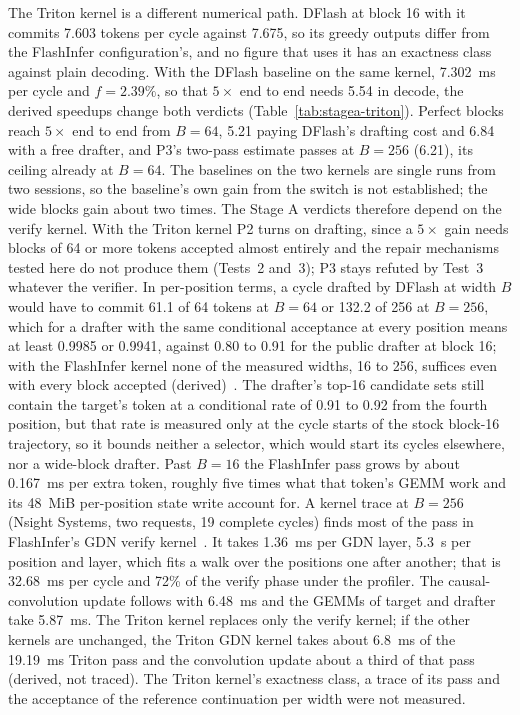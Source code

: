 The Triton kernel is a different numerical path. DFlash at block 16 with it commits 7.603 tokens per cycle against 7.675, so its greedy outputs differ from the FlashInfer configuration's, and no figure that uses it has an exactness class against plain decoding. With the DFlash baseline on the same kernel, 7.302~ms per cycle and $f=2.39\%$, so that $5\times$ end to end needs 5.54 in decode, the derived speedups change both verdicts (Table~\ref{tab:stagea-triton}). Perfect blocks reach $5\times$ end to end from $B=64$, 5.21 paying DFlash's drafting cost and 6.84 with a free drafter, and P3's two-pass estimate passes at $B=256$ (6.21), its ceiling already at $B=64$. The baselines on the two kernels are single runs from two sessions, so the baseline's own gain from the switch is not established; the wide blocks gain about two times. The Stage A verdicts therefore depend on the verify kernel. With the Triton kernel P2 turns on drafting, since a $5\times$ gain needs blocks of 64 or more tokens accepted almost entirely and the repair mechanisms tested here do not produce them (Tests~2 and~3); P3 stays refuted by Test~3 whatever the verifier. In per-position terms, a cycle drafted by DFlash at width $B$ would have to commit 61.1 of 64 tokens at $B=64$ or 132.2 of 256 at $B=256$, which for a drafter with the same conditional acceptance at every position means at least 0.9985 or 0.9941, against 0.80 to 0.91 for the public drafter at block 16; with the FlashInfer kernel none of the measured widths, 16 to 256, suffices even with every block accepted (derived)~. The drafter's top-16 candidate sets still contain the target's token at a conditional rate of 0.91 to 0.92 from the fourth position, but that rate is measured only at the cycle starts of the stock block-16 trajectory, so it bounds neither a selector, which would start its cycles elsewhere, nor a wide-block drafter. Past $B=16$ the FlashInfer pass grows by about 0.167~ms per extra token, roughly five times what that token's GEMM work and its 48~MiB per-position state write account for. A kernel trace at $B=256$ (Nsight Systems, two requests, 19 complete cycles) finds most of the pass in FlashInfer's GDN verify kernel~. It takes 1.36~ms per GDN layer, 5.3~\textmu s per position and layer, which fits a walk over the positions one after another; that is 32.68~ms per cycle and 72\% of the verify phase under the profiler. The causal-convolution update follows with 6.48~ms and the GEMMs of target and drafter take 5.87~ms. The Triton kernel replaces only the verify kernel; if the other kernels are unchanged, the Triton GDN kernel takes about 6.8~ms of the 19.19~ms Triton pass and the convolution update about a third of that pass (derived, not traced). The Triton kernel's exactness class, a trace of its pass and the acceptance of the reference continuation per width were not measured.


